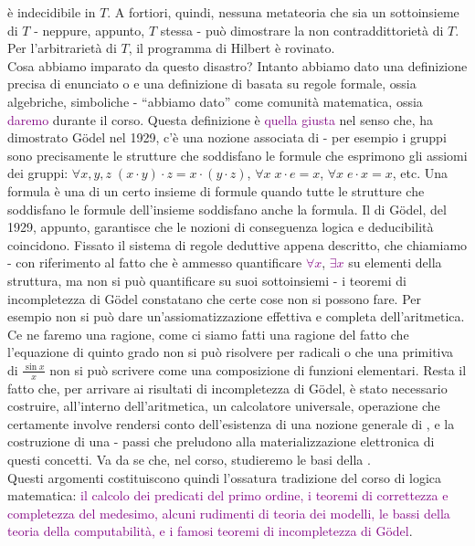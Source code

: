 è indecidibile in $T$. A fortiori, quindi, nessuna metateoria che sia un sottoinsieme di $T$ - neppure, appunto, $T$ stessa - può dimostrare la non contraddittorietà di $T$.
Per l'arbitrarietà di $T$, il programma di Hilbert è rovinato.\\
Cosa abbiamo imparato da questo disastro? Intanto abbiamo dato una definizione precisa di enunciato o  e una definizione di  basata su regole formale, ossia algebriche, simboliche - ``abbiamo dato'' come comunità matematica, ossia \textcolor{purple}{daremo} durante il corso.
Questa definizione è \textcolor{purple}{quella giusta} nel senso che, ha dimostrato Gödel nel 1929, c'è una nozione associata di  - per esempio i gruppi sono precisamente le strutture che soddisfano le formule che esprimono gli assiomi dei gruppi: $\forall x,y,z \; (x \cdot y) \cdot z = x \cdot (y \cdot z)$, $\forall x \; x \cdot e = x$,
$\forall x \; e \cdot x = x$, etc. Una formula è una  di un certo insieme di formule quando tutte le strutture che soddisfano le formule dell'insieme soddisfano anche la formula. Il  di Gödel, del 1929, appunto, garantisce che le nozioni di conseguenza logica e deducibilità coincidono.
Fissato il sistema di regole deduttive appena descritto, che chiamiamo  - con riferimento al fatto che è ammesso quantificare \textcolor{purple}{$\forall x$}, \textcolor{purple}{$\exists x$} su elementi della struttura, ma non si può quantificare su suoi sottoinsiemi - i teoremi di incompletezza di Gödel constatano 
che certe cose non si possono fare. Per esempio non si può dare un'assiomatizzazione effettiva e completa dell'aritmetica. Ce ne faremo una ragione, come ci siamo fatti una ragione del fatto che l'equazione di quinto grado non si può risolvere per radicali o che una primitiva di $\frac{\sin x}{x}$ non si può scrivere come una composizione di funzioni elementari.
Resta il fatto che, per arrivare ai risultati di incompletezza di Gödel, è stato necessario costruire, all'interno dell'aritmetica, un calcolatore universale, operazione che certamente involve rendersi conto dell'esistenza di una nozione generale di , e la costruzione di una  - passi che preludono 
alla materializzazione elettronica di questi concetti. Va da se che, nel corso, studieremo le basi della .\\
Questi argomenti costituiscono quindi l'ossatura tradizione del corso di logica matematica: \textcolor{purple}{il calcolo dei predicati del primo ordine, i teoremi di correttezza e completezza del medesimo, alcuni rudimenti di teoria dei modelli, le bassi della teoria della computabilità, e i famosi teoremi di incompletezza di Gödel}.\\
